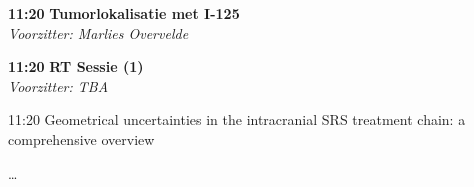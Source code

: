 \documentclass[a4paper,10pt]{report}
\begin{document}
\begin{multicols*}{3}
\begin{packed_enum}
\item[\textbf{11:20}]\textbf{Tumorlokalisatie met I-125}\\\textit{Voorzitter: Marlies Overvelde}
\end{packed_enum} %


\begin{packed_enum}
\item[\textbf{11:20}] \textbf{RT Sessie (1)}\\\textit{Voorzitter: TBA}
\item[11:20] Geometrical uncertainties in the intracranial SRS treatment chain: a comprehensive overview
\item[] \ldots\itemauthor{\ldots}
\end{packed_enum} %



\end{multicols*}
\end{document}
